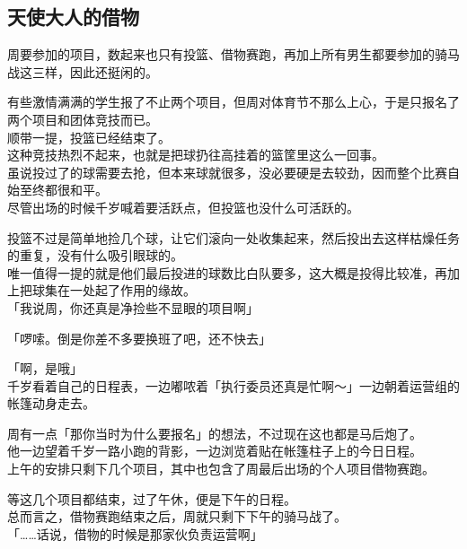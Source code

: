 \subsection{天使大人的借物}

周要参加的项目，数起来也只有投篮、借物赛跑，再加上所有男生都要参加的骑马战这三样，因此还挺闲的。

有些激情满满的学生报了不止两个项目，但周对体育节不那么上心，于是只报名了两个项目和团体竞技而已。\\

顺带一提，投篮已经结束了。\\

这种竞技热烈不起来，也就是把球扔往高挂着的篮筐里这么一回事。\\

虽说投过了的球需要去抢，但本来球就很多，没必要硬是去较劲，因而整个比赛自始至终都很和平。\\

尽管出场的时候千岁喊着要活跃点，但投篮也没什么可活跃的。

投篮不过是简单地捡几个球，让它们滚向一处收集起来，然后投出去这样枯燥任务的重复，没有什么吸引眼球的。\\

唯一值得一提的就是他们最后投进的球数比白队要多，这大概是投得比较准，再加上把球集在一处起了作用的缘故。\\

「我说周，你还真是净捡些不显眼的项目啊」

「啰嗦。倒是你差不多要换班了吧，还不快去」

「啊，是哦」\\

千岁看着自己的日程表，一边嘟哝着「执行委员还真是忙啊～」一边朝着运营组的帐篷动身走去。

周有一点「那你当时为什么要报名」的想法，不过现在这也都是马后炮了。\\

他一边望着千岁一路小跑的背影，一边浏览着贴在帐篷柱子上的今日日程。\\

上午的安排只剩下几个项目，其中也包含了周最后出场的个人项目借物赛跑。

等这几个项目都结束，过了午休，便是下午的日程。\\

总而言之，借物赛跑结束之后，周就只剩下下午的骑马战了。\\

「……话说，借物的时候是那家伙负责运营啊」\\

